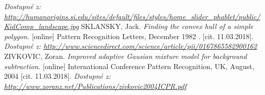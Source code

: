 \begin{thebibliography}{99}
	 \textit{Dostupné z: \url{http://humanorigins.si.edu/sites/default/files/styles/home_slider_phablet/public/KidComp_landscape.jpg}}
	SKLANSKY, Jack. \textit{Finding the convex hull of a simple polygon.} [online] Pattern Recognition Letters, December 1982 . [cit. 11.03.2018].
		\textit{Dostupné z: \url{http://www.sciencedirect.com/science/article/pii/0167865582900162}}
	ZIVKOVIC, Zoran. \textit{Improved adaptive Gausian mixture model for background subtraction.} [online] International Conference Pattern Recognition, UK, August, 2004 [cit. 11.03.2018].
		\textit{Dostupné z: \url{http://www.zoranz.net/Publications/zivkovic2004ICPR.pdf}}

\end{thebibliography}
